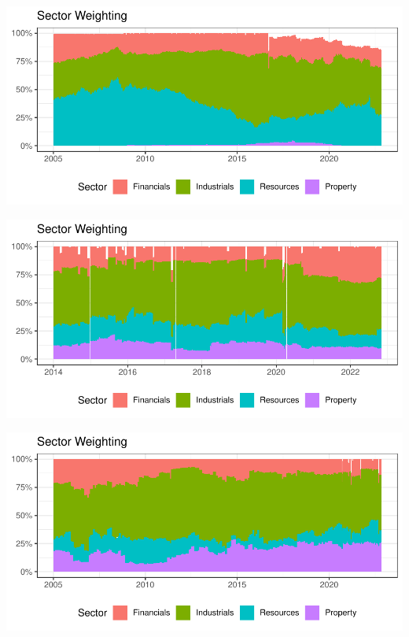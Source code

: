 \documentclass[11pt,preprint, authoryear]{elsarticle}
\let\origfigure\figure
\let\endorigfigure\endfigure
\renewenvironment{figure}[1][2] {
    \expandafter\origfigure\expandafter[H]
} {
    \endorigfigure
}
\numberwithin{equation}{section}
\numberwithin{figure}{section}
\numberwithin{table}{section}
\begin{document}
\begin{figure}[H]

{\centering \includegraphics{Volatility-of-Shares_files/figure-latex/Figure4-1} 

}

\caption{Sector weights for Large Cap index \label{Figure4}}\label{fig:Figure4}
\end{figure}

\begin{figure}[H]

{\centering \includegraphics{Volatility-of-Shares_files/figure-latex/Figure5-1} 

}

\caption{Sector weights for Mid Cap index \label{Figure5}}\label{fig:Figure5}
\end{figure}

\begin{figure}[H]

{\centering \includegraphics{Volatility-of-Shares_files/figure-latex/Figure6-1} 

}

\caption{Sector weights for Small Cap index \label{Figure6}}\label{fig:Figure6}
\end{figure}
\end{document}
